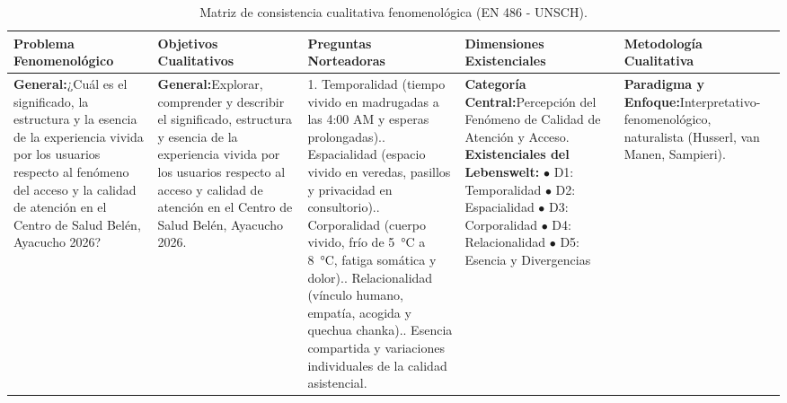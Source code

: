 \begin{table}[H]
\centering
\scriptsize
\caption{Matriz de consistencia cualitativa fenomenológica (EN 486 - UNSCH).}
\label{tab:matriz_consistencia}
\vspace{0.2cm}
\begin{tabularx}{\textwidth}{p{2.6cm}p{2.7cm}p{2.6cm}p{2.6cm}X}
\toprule
\textbf{Problema Fenomenológico} & \textbf{Objetivos Cualitativos} & \textbf{Preguntas Norteadoras} & \textbf{Dimensiones Existenciales} & \textbf{Metodología Cualitativa} \\
\midrule
\textbf{General:}\newline ¿Cuál es el significado, la estructura y la esencia de la experiencia vivida por los usuarios respecto al fenómeno del acceso y la calidad de atención en el Centro de Salud Belén, Ayacucho 2026? & 
\textbf{General:}\newline Explorar, comprender y describir el significado, estructura y esencia de la experiencia vivida por los usuarios respecto al acceso y calidad de atención en el Centro de Salud Belén, Ayacucho 2026. & 
1. Temporalidad (tiempo vivido en madrugadas a las 4:00 AM y esperas prolongadas).\newline 
2. Espacialidad (espacio vivido en veredas, pasillos y privacidad en consultorio).\newline 
3. Corporalidad (cuerpo vivido, frío de 5~°C a 8~°C, fatiga somática y dolor).\newline 
4. Relacionalidad (vínculo humano, empatía, acogida y quechua chanka).\newline 
5. Esencia compartida y variaciones individuales de la calidad asistencial. & 
\textbf{Categoría Central:}\newline Percepción del Fenómeno de Calidad de Atención y Acceso.\newline\newline 
\textbf{Existenciales del Lebenswelt:}\newline 
$\bullet$ D1: Temporalidad\newline 
$\bullet$ D2: Espacialidad\newline 
$\bullet$ D3: Corporalidad\newline 
$\bullet$ D4: Relacionalidad\newline 
$\bullet$ D5: Esencia y Divergencias & 
\textbf{Paradigma y Enfoque:}\newline Interpretativo-fenomenológico, naturalista (Husserl, van Manen, Sampieri).\newline\newline 

\end{tabularx}
\end{table}
